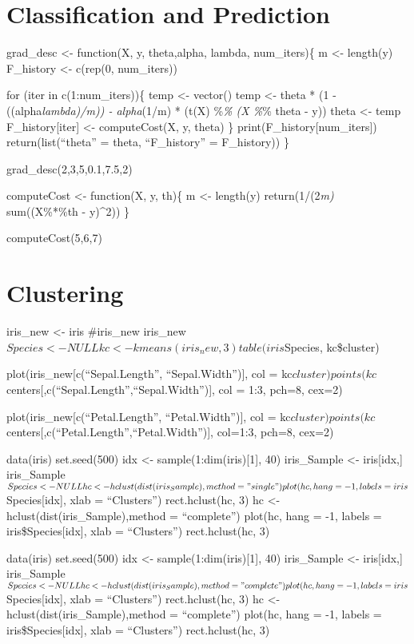 \documentclass[
]{article}
\begin{document}
\section{Classification and
Prediction}\label{classification-and-prediction}

grad\_desc \textless- function(X, y, theta,alpha, lambda, num\_iters)\{
m \textless- length(y) F\_history \textless- c(rep(0, num\_iters))

for (iter in c(1:num\_iters))\{ temp \textless- vector() temp \textless-
theta * (1 - ((alpha\emph{lambda)/m)) - alpha}(1/m) * (t(X) \%\emph{\%
(X \%}\% theta - y)) theta \textless- temp F\_history{[}iter{]}
\textless- computeCost(X, y, theta) \} print(F\_history{[}num\_iters{]})
return(list(``theta'' = theta, ``F\_history'' = F\_history)) \}

grad\_desc(2,3,5,0.1,7.5,2)

computeCost \textless- function(X, y, th)\{ m \textless- length(y)
return(1/(2\emph{m) } sum((X\%*\%th - y)\^{}2)) \}

computeCost(5,6,7)

\section{Clustering}\label{clustering}

iris\_new \textless- iris \#iris\_new iris\_new\(Species <- NULL
kc <- kmeans(iris_new, 3)
table(iris\)Species, kc\$cluster)

plot(iris\_new{[}c(``Sepal.Length'', ``Sepal.Width''){]}, col =
kc\(cluster)
points(kc\)centers{[},c(``Sepal.Length'',``Sepal.Width''){]}, col = 1:3,
pch=8, cex=2)

plot(iris\_new{[}c(``Petal.Length'', ``Petal.Width''){]}, col =
kc\(cluster)
points(kc\)centers{[},c(``Petal.Length'',``Petal.Width''){]}, col=1:3,
pch=8, cex=2)

data(iris) set.seed(500) idx \textless- sample(1:dim(iris){[}1{]}, 40)
iris\_Sample \textless- iris{[}idx,{]} iris\_Sample\(Species <- NULL
hc <- hclust(dist(iris_Sample), method = "single")
plot(hc, hang = -1, labels = iris\)Species{[}idx{]}, xlab =
``Clusters'') rect.hclust(hc, 3) hc \textless-
hclust(dist(iris\_Sample),method = ``complete'') plot(hc, hang = -1,
labels = iris\$Species{[}idx{]}, xlab = ``Clusters'') rect.hclust(hc, 3)

data(iris) set.seed(500) idx \textless- sample(1:dim(iris){[}1{]}, 40)
iris\_Sample \textless- iris{[}idx,{]} iris\_Sample\(Species <- NULL
hc <- hclust(dist(iris_Sample), method = "complete")
plot(hc, hang = -1, labels = iris\)Species{[}idx{]}, xlab =
``Clusters'') rect.hclust(hc, 3) hc \textless-
hclust(dist(iris\_Sample),method = ``complete'') plot(hc, hang = -1,
labels = iris\$Species{[}idx{]}, xlab = ``Clusters'') rect.hclust(hc, 3)
\end{document}
